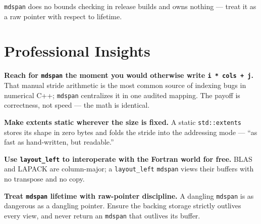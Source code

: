 \lstinline|mdspan| does no bounds checking in release builds and owns nothing --- treat it as a raw pointer with respect to lifetime.

\section{Professional Insights}

\textbf{Reach for \lstinline|mdspan| the moment you would otherwise write \lstinline|i * cols + j|.} That manual stride arithmetic is the most common source of indexing bugs in numerical C++; \lstinline|mdspan| centralizes it in one audited mapping. The payoff is correctness, not speed --- the math is identical.

\textbf{Make extents static wherever the size is fixed.} A static \lstinline|std::extents| stores its shape in zero bytes and folds the stride into the addressing mode --- ``as fast as hand-written, but readable.''

\textbf{Use \lstinline|layout_left| to interoperate with the Fortran world for free.} BLAS and LAPACK are column-major; a \lstinline|layout_left| \lstinline|mdspan| views their buffers with no transpose and no copy.

\textbf{Treat \lstinline|mdspan| lifetime with raw-pointer discipline.} A dangling \lstinline|mdspan| is as dangerous as a dangling pointer. Ensure the backing storage strictly outlives every view, and never return an \lstinline|mdspan| that outlives its buffer.
